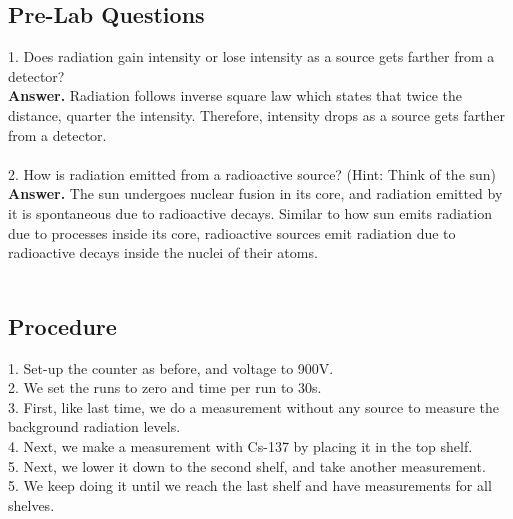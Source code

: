\documentclass[twocolumn]{article}
\begin{document}
\subsection*{Pre-Lab Questions}

1. Does radiation gain intensity or lose intensity as a source gets farther from a detector?\\
\textbf{Answer.} Radiation follows inverse square law which states that twice the distance, quarter the intensity. Therefore, intensity drops as a source gets farther from a detector.\\
\\
2. How is radiation emitted from a radioactive source? (Hint: Think of the sun)\\
\textbf{Answer.} The sun undergoes nuclear fusion in its core, and radiation emitted by it is spontaneous due to radioactive decays. Similar to how sun emits radiation due to processes inside its core, radioactive sources emit radiation due to radioactive decays inside the nuclei of their atoms.\\
\\

\subsection*{Procedure}
1. Set-up the counter as before, and voltage to 900V.\\
2. We set the runs to zero and time per run to 30s.\\
3. First, like last time, we do a measurement without any source to measure the background radiation levels.\\
4. Next, we make a measurement with Cs-137 by placing it in the top shelf.\\
5. Next, we lower it down to the second shelf, and take another measurement.\\
5. We keep doing it until we reach the last shelf and have measurements for all shelves.
$$$$
\end{document}
